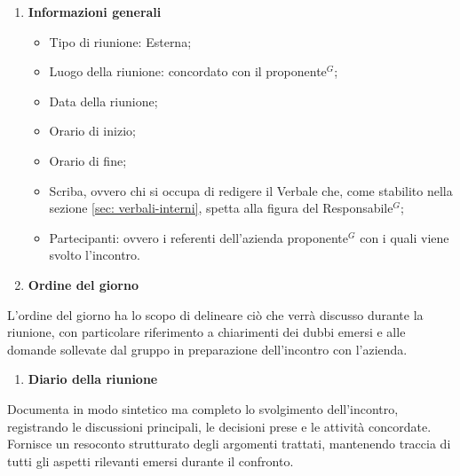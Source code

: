     \begin{enumerate}[label=\arabic*., itemsep=0pt, parsep=1pt, leftmargin=*]
        \item \textbf{Informazioni generali}
        \begin{itemize}[label=--, itemsep=0pt, parsep=1pt, leftmargin=1.5em]
            \item Tipo di riunione: Esterna;
            \item Luogo della riunione: concordato con il proponente$^G$;
            \item Data della riunione;
            \item Orario di inizio; 
            \item Orario di fine;
            \item Scriba, ovvero chi si occupa di redigere il Verbale che, come stabilito nella sezione \ref{sec: verbali-interni}, spetta alla figura del Responsabile$^G$;
            \item Partecipanti: ovvero i referenti dell'azienda proponente$^G$ con i quali viene svolto l'incontro. 
        \end{itemize}
        \item \textbf{Ordine del giorno} 
    \end{enumerate}
    \vspace{-0.5em}
    L'ordine del giorno ha lo scopo di delineare ciò che verrà discusso durante la riunione, con particolare riferimento a chiarimenti dei dubbi emersi e alle domande sollevate dal gruppo in preparazione dell'incontro con l'azienda.

    \begin{enumerate}[resume*, itemsep=0pt, parsep=1pt, leftmargin=*, label=\arabic*.]
        \item \textbf{Diario della riunione}
    \end{enumerate}
    \vspace{-0.5em}
    Documenta in modo sintetico ma completo lo svolgimento dell'incontro, registrando le discussioni principali, le decisioni prese e le attività concordate. Fornisce un resoconto strutturato degli argomenti trattati, mantenendo traccia di tutti gli aspetti rilevanti emersi durante il confronto.

